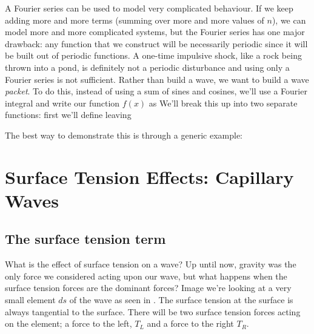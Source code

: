 \documentclass[12pt]{book}
\begin{document}
A Fourier series can be used to model very complicated behaviour. If we keep adding more and more terms (summing over more and more values of $n$), we can model more and more complicated systems, but the Fourier series has one major drawback: any function that we construct will be necessarily periodic since it will be built out of periodic functions.  A one-time impulsive shock, like a rock being thrown into a pond, is definitely not a periodic disturbance and using only a Fourier series is not sufficient.  Rather than build a wave, we want to build a wave \textit{packet}.  To do this, instead of using a sum of sines and cosines, we'll use a Fourier integral and write our function $f(x)$ as
We'll break this up into two separate functions: first we'll  define
leaving


The best way to demonstrate this is through a generic example:






















\section{Surface Tension Effects: Capillary Waves}
\subsection{The surface tension term}
What is the effect of surface tension on a wave?  Up until now, gravity was the only force we considered acting upon our wave, but what happens when the surface tension forces are the dominant forces?  Image we're looking at a very small element $ds$ of the wave as seen in .  The surface tension at the surface is always tangential to the surface.  There will be two surface tension forces acting on the element; a force to the left, $T_L$ and a force to the right $T_R$.
\end{document}

